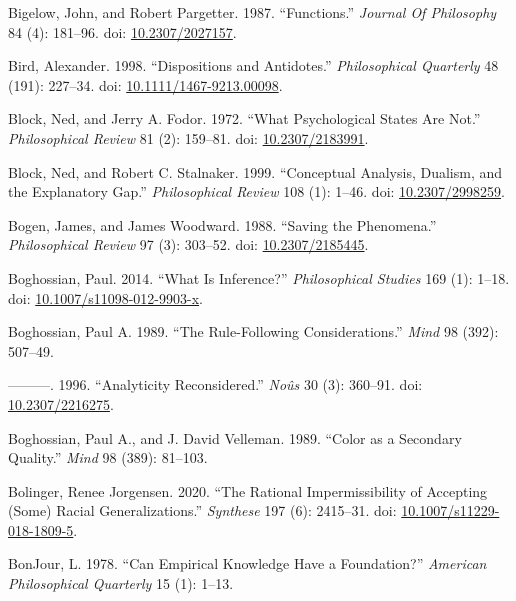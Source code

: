 \documentclass[
  10pt,
  letterpaper,
  DIV=11,
  numbers=noendperiod,
  twoside]{scrartcl}
\newlength{\cslhangindent}
\newenvironment{CSLReferences}[2] %
 {\begin{list}{}{%
  \setlength{\itemindent}{0pt}
  \setlength{\leftmargin}{0pt}
  \setlength{\parsep}{0pt}
  \ifodd #1
   \setlength{\leftmargin}{\cslhangindent}
   \setlength{\itemindent}{-1\cslhangindent}
  \fi
  \setlength{\itemsep}{#2\baselineskip}}}
 {\end{list}}
\begin{document}
\begin{CSLReferences}{1}{0}
Bigelow, John, and Robert Pargetter. 1987. {``Functions.''}
\emph{Journal Of Philosophy} 84 (4): 181--96. doi:
\href{https://doi.org/10.2307/2027157}{10.2307/2027157}.

Bird, Alexander. 1998. {``Dispositions and Antidotes.''}
\emph{Philosophical Quarterly} 48 (191): 227--34. doi:
\href{https://doi.org/10.1111/1467-9213.00098}{10.1111/1467-9213.00098}.

Block, Ned, and Jerry A. Fodor. 1972. {``What Psychological States Are
Not.''} \emph{Philosophical Review} 81 (2): 159--81. doi:
\href{https://doi.org/10.2307/2183991}{10.2307/2183991}.

Block, Ned, and Robert C. Stalnaker. 1999. {``Conceptual Analysis,
Dualism, and the Explanatory Gap.''} \emph{Philosophical Review} 108
(1): 1--46. doi:
\href{https://doi.org/10.2307/2998259}{10.2307/2998259}.

Bogen, James, and James Woodward. 1988. {``Saving the Phenomena.''}
\emph{Philosophical Review} 97 (3): 303--52. doi:
\href{https://doi.org/10.2307/2185445}{10.2307/2185445}.

Boghossian, Paul. 2014. {``What Is Inference?''} \emph{Philosophical
Studies} 169 (1): 1--18. doi:
\href{https://doi.org/10.1007/s11098-012-9903-x}{10.1007/s11098-012-9903-x}.

Boghossian, Paul A. 1989. {``The Rule-Following Considerations.''}
\emph{Mind} 98 (392): 507--49.

---------. 1996. {``Analyticity Reconsidered.''} \emph{Noûs} 30 (3):
360--91. doi: \href{https://doi.org/10.2307/2216275}{10.2307/2216275}.

Boghossian, Paul A., and J. David Velleman. 1989. {``Color as a
Secondary Quality.''} \emph{Mind} 98 (389): 81--103.

Bolinger, Renee Jorgensen. 2020. {``The Rational Impermissibility of
Accepting (Some) Racial Generalizations.''} \emph{Synthese} 197 (6):
2415--31. doi:
\href{https://doi.org/10.1007/s11229-018-1809-5}{10.1007/s11229-018-1809-5}.

BonJour, L. 1978. {``Can Empirical Knowledge Have a Foundation?''}
\emph{American Philosophical Quarterly} 15 (1): 1--13.


\end{CSLReferences}
\end{document}
